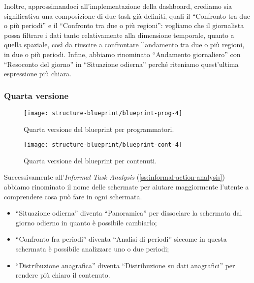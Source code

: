 Inoltre, approssimandoci all'implementazione della dashboard, crediamo sia significativa una composizione di due task già definiti, quali il ``Confronto tra due o più periodi'' e il ``Confronto tra due o più regioni'': vogliamo che il giornalista possa filtrare i dati tanto relativamente alla dimensione temporale, quanto a quella spaziale, così da riuscire a confrontare l'andamento tra due o più regioni, in due o più periodi.
Infine, abbiamo rinominato ``Andamento giornaliero'' con ``Resoconto del giorno'' in ``Situazione odierna'' perché riteniamo quest'ultima espressione più chiara. 

\subsubsection{Quarta versione}
\begin{figure}[H]
    \centering
    \texttt{[image: structure-blueprint/blueprint-prog-4]}
    \caption{Quarta versione del blueprint per programmatori.}\label{fig:blueprint-prog-4}
\end{figure}
\begin{figure}[H]
    \centering
    \texttt{[image: structure-blueprint/blueprint-cont-4]}
    \caption{Quarta versione del blueprint per contenuti.}\label{fig:blueprint-cont-4}
\end{figure}
Successivamente all'\textit{Informal Task Analysis} (\ref{ss:informal-action-analysis}) abbiamo rinominato il nome delle schermate per aiutare maggiormente l'utente a comprendere cosa può fare in ogni schermata.
\begin{itemize}
    \item ``Situazione odierna'' diventa ``Panoramica'' per dissociare la schermata dal giorno odierno in quanto è possibile cambiarlo;
    \item ``Confronto fra periodi'' diventa ``Analisi di periodi'' siccome in questa schermata è possibile analizzare uno o due periodi;
    \item ``Distribuzione anagrafica'' diventa ``Distribuzione su dati anagrafici'' per rendere più chiaro il contenuto.
\end{itemize}


